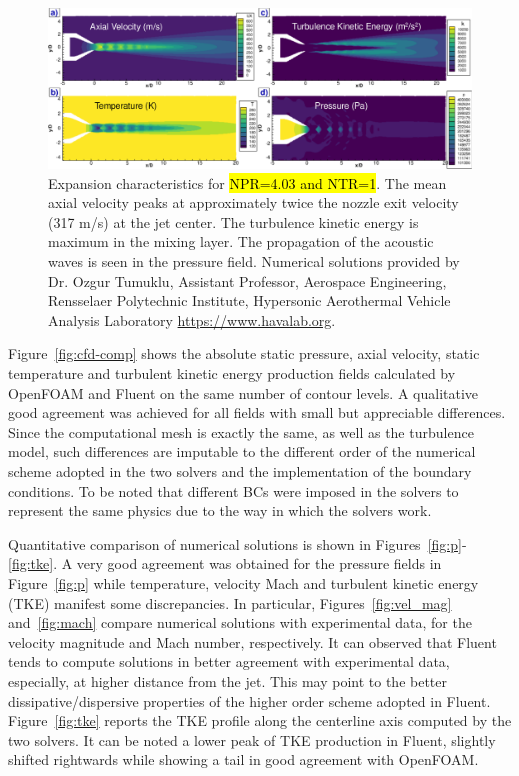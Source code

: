 \documentclass[12pt]{article}
\begin{document}
\begin{figure}[H]
    \centering
    \includegraphics[width=\linewidth]{figs/f5.png}
    \caption{Expansion characteristics for \hl{NPR=4.03 and NTR=1}. The mean axial velocity peaks at approximately twice the nozzle exit velocity (317 m/s) at the jet center. The turbulence kinetic energy is maximum in the mixing layer. The propagation of the acoustic waves is seen in the pressure field. Numerical solutions provided by Dr. Ozgur Tumuklu, Assistant Professor, Aerospace Engineering, Rensselaer Polytechnic Institute, Hypersonic Aerothermal Vehicle Analysis Laboratory \url{https://www.havalab.org}.}
    \label{fig:ref_num-sols}
\end{figure}

Figure~\ref{fig:cfd-comp} shows the absolute static pressure, axial velocity, static temperature and turbulent kinetic energy production fields calculated by OpenFOAM and Fluent on the same number of contour levels. A qualitative good agreement was achieved for all fields with small but appreciable differences. Since the computational mesh is exactly the same, as well as the turbulence model, such differences are imputable to the different order of the numerical scheme adopted in the two solvers and the implementation of the boundary conditions. To be noted that different BCs were imposed in the solvers to represent the same physics due to the way in which the solvers work.

Quantitative comparison of numerical solutions is shown in Figures~\ref{fig:p}-\ref{fig:tke}. A very good agreement was obtained for the pressure fields in Figure~\ref{fig:p} while temperature, velocity Mach and turbulent kinetic energy (TKE) manifest some discrepancies. In particular, Figures~\ref{fig:vel_mag} and~\ref{fig:mach} compare numerical solutions with experimental data, for the velocity magnitude and Mach number, respectively. It can observed that Fluent tends to compute solutions in better agreement with experimental data, especially, at higher distance from the jet. This may point to the better dissipative/dispersive properties of the higher order scheme adopted in Fluent. Figure~\ref{fig:tke} reports the TKE profile along the centerline axis computed by the two solvers. It can be noted a lower peak of TKE production in Fluent, slightly shifted rightwards while showing a tail in good agreement with OpenFOAM.
\end{document}
